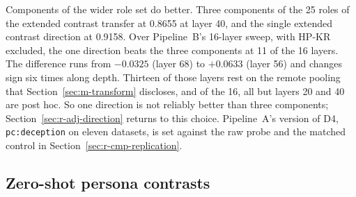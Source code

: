 Components of the wider role set do better. %
Three components of the 25 roles of the extended contrast transfer at 0.8655 at layer 40, and the single extended contrast direction at 0.9158. %
Over Pipeline~B's 16-layer sweep, with HP-KR excluded, the one direction beats the three components at 11 of the 16 layers. %
The difference runs from $-0.0325$ (layer 68) to $+0.0633$ (layer 56) and changes sign six times along depth. %
Thirteen of those layers rest on the remote pooling that Section~\ref{sec:m-transform} discloses, and of the 16, all but layers 20 and 40 are post hoc. %
So one direction is not reliably better than three components; Section~\ref{sec:r-adj-direction} returns to this choice. %
Pipeline~A's version of D4, \texttt{pc:deception} on eleven datasets, is set against the raw probe and the matched control in Section~\ref{sec:r-cmp-replication}.

\subsection{Zero-shot persona contrasts}
\label{sec:r-zeroshot}

